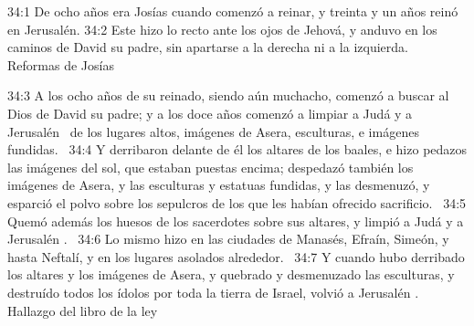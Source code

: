 																																		
																																		34:1 De ocho años era Josías cuando comenzó a reinar, y treinta y un años reinó en Jerusalén. 
																																		34:2 Este hizo lo recto ante los ojos de Jehová, y anduvo en los caminos de David su padre, sin apartarse a la derecha ni a la izquierda.  
																																		Reformas de Josías 
																																		
																																		34:3 A los ocho años de su reinado, siendo aún muchacho, comenzó a buscar al Dios de David su padre; y a los doce años comenzó a limpiar a Judá y a Jerusalén  de los lugares altos, imágenes de Asera, esculturas, e imágenes fundidas.  
																																		34:4 Y derribaron delante de él los altares de los baales, e hizo pedazos las imágenes del sol, que estaban puestas encima; despedazó también los imágenes de Asera, y las esculturas y estatuas fundidas, y las desmenuzó, y esparció el polvo sobre los sepulcros de los que les habían ofrecido sacrificio.  
																																		34:5 Quemó además los huesos de los sacerdotes sobre sus altares, y limpió a Judá y a Jerusalén .  
																																		34:6 Lo mismo hizo en las ciudades de Manasés, Efraín, Simeón, y hasta Neftalí, y en los lugares asolados alrededor.  
																																		34:7 Y cuando hubo derribado los altares y los imágenes de Asera, y quebrado y desmenuzado las esculturas, y destruído todos los ídolos por toda la tierra de Israel, volvió a Jerusalén .  
																																		Hallazgo del libro de la ley 
																																		
